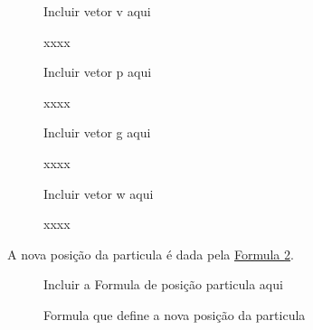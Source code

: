                 \begin{figure}[!htb]
                    \begin{minipage}{\textwidth}

                        \begin{minipage}{0.5\textwidth}
                            \centering
                            \small{Incluir vetor v aqui}
                            \caption{xxxx}
                            \label{fig:vetor-v}
                        \end{minipage}
                        \begin{minipage}{0.5\textwidth}
                            \centering
                            \small{Incluir vetor p aqui}
                            \caption{xxxx}
                            \label{fig:vetor-p}
                        \end{minipage}

                        \begin{minipage}{0.5\textwidth}
                            \centering
                            \small{Incluir vetor g aqui}
                            \caption{xxxx}
                            \label{fig:vetor-g}
                        \end{minipage}
                        \begin{minipage}{0.5\textwidth}
                            \centering
                            \small{Incluir vetor w aqui}
                            \caption{xxxx}
                            \label{fig:vetor-w}
                        \end{minipage}

                    \end{minipage}
                \end{figure}

                \noindent A nova posição da particula é dada pela 
                \hyperref[fig:formula-nova-posicao]{Formula \ref{fig:formula-nova-posicao}}.
                
                \begin{figure}[h]
                    \centering
                    \small{Incluir a Formula de posição particula aqui}
                    \caption{Formula que define a nova posição da particula}
                    \label{fig:formula-nova-posicao}
                \end{figure}

